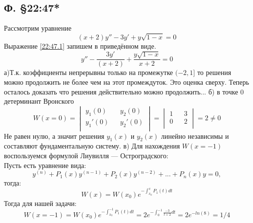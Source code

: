 \documentclass{article}
\begin{document}
\subsection{Ф. \S22:47*}
Рассмотрим уравнение 
\begin{equation} \label{22:47.1}
(x+2)y''-3y'+y \sqrt{1-x}=0    
\end{equation}
Выражение \ref{22:47.1} запишем в приведённом виде.
\begin{equation}
    y''- \frac{3y'}{(x+2)} + \frac{y \sqrt{1-x}}{x+2}=0 
\end{equation}
а)Т.к. коэффициенты непрерывны только на промежутке $(-2,1]$ то решения можно продолжить не более чем на этот промеждуток. Это оценка сверху. Теперь осталось доказать что решения действительно можно продолжить...
б) в точке 0 детерминант Вронского
\begin{equation*}
W(x=0)=
\begin{vmatrix}
y_1(0) && y_2(0)\\
y_1'(0) && y_2'(0)\\
\end{vmatrix}
=
\begin{vmatrix}
1 && 3\\
0 && 2\\
\end{vmatrix}
= 2 \neq 0
\end{equation*}
Не равен нулю, а значит решения $y_1(x)$ и $y_2(x)$ линейно независимы и составляют фундаментальную систему.
в) Для нахождения $W(x=-1)$ воспользуемся формулой Лиувилля — Остроградского: \\
Пусть есть уравнение вида:
\begin{equation}
    y^{(n)}+P_{1}(x)y^{(n-1)}+P_{2}(x)y^{(n-2)}+...+P_{n}(x)y=0,
\end{equation}
тогда:
\begin{equation}
    W(x)=W(x_0) e^{-\int_{x_0}^x P_1(t)dt}
\end{equation}
Тогда для нашей задачи:
\begin{equation}
    W(x=-1)=W(x_0) e^{-\int_{x_0}^{-1} P_1(t)dt}=2 e^{-\int_{0}^{-1} \frac{-3}{t+2}dt}=2 e^{-ln(8)}=1/4
\end{equation}
\end{document}
